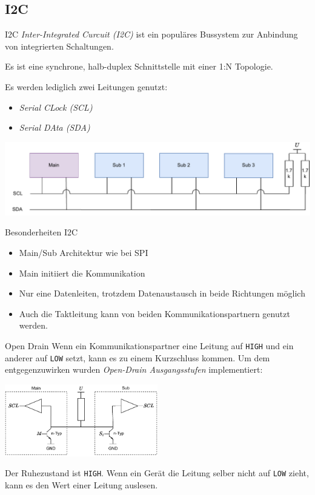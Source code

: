 \subsection{I2C}

\begin{defi}{I2C}
    \emph{Inter-Integrated Curcuit (I2C)} ist ein populäres Bussystem zur Anbindung von integrierten Schaltungen.

    Es ist eine synchrone, halb-duplex Schnittstelle mit einer 1:N Topologie.

    Es werden lediglich zwei Leitungen genutzt:
    \begin{itemize}
        \item \emph{Serial CLock (SCL)}
        \item \emph{Serial DAta (SDA)}
    \end{itemize}

    \includegraphics[width=\textwidth]{includes/figures/defi_i2c.pdf}
\end{defi}

\begin{bonus}{Besonderheiten I2C}
    \begin{itemize}
        \item Main/Sub Architektur wie bei SPI
        \item Main initiiert die Kommunikation
        \item Nur eine Datenleiten, trotzdem Datenaustausch in beide Richtungen möglich
        \item Auch die Taktleitung kann von beiden Kommunikationspartnern genutzt werden.
    \end{itemize}
\end{bonus}

\begin{defi}{Open Drain}
    Wenn ein Kommunikationspartner eine Leitung auf \texttt{HIGH} und ein anderer auf \texttt{LOW} setzt, kann es zu einem Kurzschluss kommen.
    Um dem entgegenzuwirken wurden \emph{Open-Drain Ausgangsstufen} implementiert:

    \begin{center}
        \includegraphics[width=0.5\textwidth]{includes/figures/defi_open_drain.pdf}
    \end{center}

    Der Ruhezustand ist \texttt{HIGH}.
    Wenn ein Gerät die Leitung selber nicht auf \texttt{LOW} zieht, kann es den Wert einer Leitung auslesen.
\end{defi}

